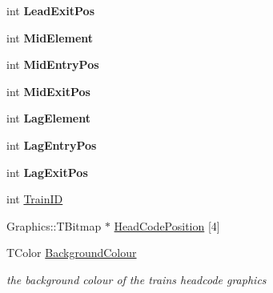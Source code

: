 \begin{DoxyCompactItemize}
int {\bfseries Lead\+Exit\+Pos}
\item 
\mbox{\label{class_t_train_a6f92853cac4bf9f463effe07c2432270}} 
int {\bfseries Mid\+Element}
\item 
\mbox{\label{class_t_train_a9594b786d0a6d35cfa82b1084f90c82f}} 
int {\bfseries Mid\+Entry\+Pos}
\item 
\mbox{\label{class_t_train_a6c0d3ad2ffe11093982406e5d449bbd1}} 
int {\bfseries Mid\+Exit\+Pos}
\item 
\mbox{\label{class_t_train_ab2b55af1125e9cd1dcbad6d890a33edb}} 
int {\bfseries Lag\+Element}
\item 
\mbox{\label{class_t_train_a8d164779b76b56ab0508197280cb0180}} 
int {\bfseries Lag\+Entry\+Pos}
\item 
\mbox{\label{class_t_train_a79b51b68b8e6c0f48330aaf3a99ee5c6}} 
int {\bfseries Lag\+Exit\+Pos}
\item 
int \mbox{\hyperlink{class_t_train_a95a26f26e890d53e38f1f8067977ef0e}{Train\+ID}}
\item 
Graphics\+::\+T\+Bitmap $\ast$ \mbox{\hyperlink{class_t_train_a9b4cfd30341ab156b539eb3a5a9fe7a3}{Head\+Code\+Position}} \mbox{[}4\mbox{]}
\item 
\mbox{\label{class_t_train_acee68f1e0863f2dc008a69f9c4be0fe6}} 
T\+Color \mbox{\hyperlink{class_t_train_acee68f1e0863f2dc008a69f9c4be0fe6}{Background\+Colour}}
\begin{DoxyCompactList}\small\item\em the background colour of the train\textquotesingle{}s headcode graphics \end{DoxyCompactList}\end{DoxyCompactItemize}
